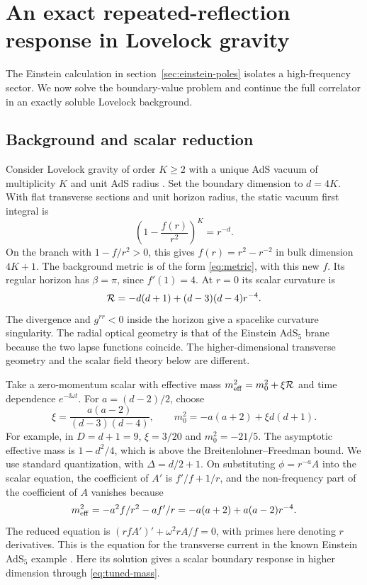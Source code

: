 \section{An exact repeated-reflection response in Lovelock gravity}
\label{sec:lovelock}

The Einstein calculation in section~\ref{sec:einstein-poles} isolates a high-frequency sector. We now solve the boundary-value problem and continue the full correlator in an exactly soluble Lovelock background.

\subsection{Background and scalar reduction}

Consider Lovelock gravity of order \(K\geq2\) with a unique AdS vacuum of multiplicity \(K\) and unit AdS radius \cite{Crisostomo:2000,Cai:2001,BravoGaete:2013}. Set the boundary dimension to \(d=4K\). With flat transverse sections and unit horizon radius, the static vacuum first integral is
\begin{equation}
 \left(1-\frac{f(r)}{r^2}\right)^K=r^{-d}.
\end{equation}
On the branch with \(1-f/r^2>0\), this gives \(f(r)=r^2-r^{-2}\) in bulk dimension \(4K+1\). The background metric is of the form \eqref{eq:metric}, with this new \(f\). Its regular horizon has \(\beta=\pi\), since \(f'(1)=4\). At \(r=0\) its scalar curvature is
\begin{equation}
 {\cal R}=-d(d+1)+(d-3)(d-4)r^{-4}.
\end{equation}
The divergence and \(g^{rr}<0\) inside the horizon give a spacelike curvature singularity. The radial optical geometry is that of the Einstein AdS\(_5\) brane because the two lapse functions coincide. The higher-dimensional transverse geometry and the scalar field theory below are different.

Take a zero-momentum scalar with effective mass \(m_{\rm eff}^2=m_0^2+\xi{\cal R}\) and time dependence \(e^{-\ii\omega t}\). For \(a=(d-2)/2\), choose
\begin{equation}
 \xi=\frac{a(a-2)}{(d-3)(d-4)},\qquad
 m_0^2=-a(a+2)+\xi d(d+1).
 \label{eq:tuned-mass}
\end{equation}
For example, in \(D=d+1=9\), \(\xi=3/20\) and \(m_0^2=-21/5\). The asymptotic effective mass is \(1-d^2/4\), which is above the Breitenlohner--Freedman bound. We use standard quantization, with \(\Delta=d/2+1\). On substituting \(\phi=r^{-a}A\) into the scalar equation, the coefficient of \(A'\) is \(f'/f+1/r\), and the non-frequency part of the coefficient of \(A\) vanishes because
\begin{equation}
 m_{\rm eff}^2=-a^2 f/r^2-a f'/r=-a(a+2)+a(a-2)r^{-4}.
\end{equation}
The reduced equation is \((r f A')'+\omega^2 r A/f=0\), with primes here denoting \(r\) derivatives. This is the equation for the transverse current in the known Einstein AdS\(_5\) example \cite{Kovtun:2005,AfkhamiJeddi:2025}. Here its solution gives a scalar boundary response in higher dimension through \eqref{eq:tuned-mass}.

